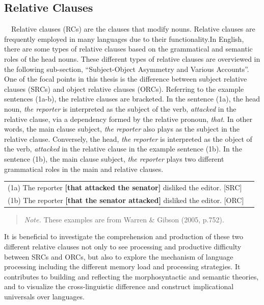 \documentclass[
]{article}
\begin{document}
\subsection{Relative Clauses}\label{relative-clauses}

\indent　Relative clauses (RCs) are the clauses that modify nouns.
Relative clauses are frequently employed in many languages due to their
functionality.In English, there are some types of relative clauses based
on the grammatical and semantic roles of the head nouns. These different
types of relative clauses are overviewed in the following sub-section,
``Subject-Object Asymmetry and Various Accounts''. One of the focal
points in this thesis is the difference between subject relative clauses
(SRCs) and object relative clauses (ORCs). Referring to the example
sentences (1a-b), the relative clauses are bracketed. In the sentence
(1a), the head noun, \emph{the reporter} is interpreted as the subject
of the verb, \emph{attacked} in the relative clause, via a dependency
formed by the relative pronoun, \emph{that}. In other words, the main
clause subject, \emph{the reporter} also plays as the subject in the
relative clause. Conversely, the head, \emph{the reporter} is
interpreted as the object of the verb, \emph{attacked} in the relative
clause in the example sentence (1b). In the sentence (1b), the main
clause subject, \emph{the reporter} plays two different grammatical
roles in the main and relative clauses.

\vspace{1em}
{
\setlength{\parindent}{0pt}
\noindent
\begin{tabular}[t]{@{}ll}
(1a) The reporter \textbf{[that attacked the senator]} disliked the editor. [SRC] \\
(1b) The reporter \textbf{[that the senator attacked]} disliked the editor. [ORC] \\
\end{tabular}
\vspace{1em}

\noindent
\begin{quote}
\small
\textit{Note.} These examples are from Warren \& Gibson (2005, p.752).
\end{quote}
\vspace{1em}
}

It is beneficial to investigate the comprehension and production of
these two different relative clauses not only to see processing and
productive difficulty between SRCs and ORCs, but also to explore the
mechanism of language processing including the different memory load and
processing strategies. It contributes to building and reflecting the
morphosyntactic and semantic theories, and to visualize the
cross-linguistic difference and construct implicational universals over
languages.
\end{document}
